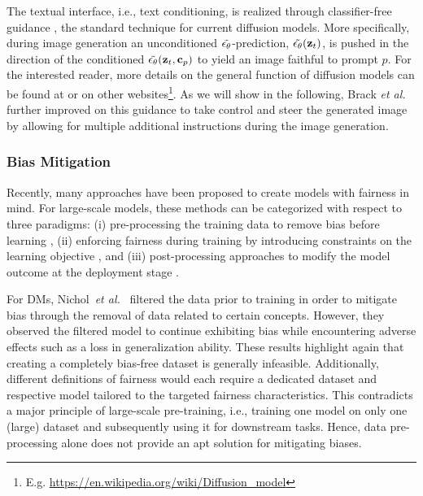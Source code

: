 \documentclass{article}%
\newcommand{\etal}{\emph{et al.}~}
\begin{document}
The textual interface, i.e., text conditioning, is realized through classifier-free guidance \cite{ho2022classifier}, the standard technique for current diffusion models. 
More specifically, during image generation an unconditioned $\Tilde{\epsilon_\theta}$-prediction, $\Tilde{\epsilon_\theta}(\mathbf{z}_t)$, is pushed in the direction of the conditioned $\Tilde{\epsilon_\theta}(\mathbf{z}_t, \mathbf{c}_p)$ to yield an image faithful to prompt $p$. For the interested reader, more details on the general function of diffusion models can be found at \cite{luo2022understanding} or on other websites\footnote{E.g. \url{https://en.wikipedia.org/wiki/Diffusion_model}}.
As we will show in the following, Brack \etal \cite{brack2023Sega} further improved on this guidance to take control and steer the generated image by allowing for multiple additional instructions during the image generation. 


\subsubsection*{Bias Mitigation}
\label{sec:related}
Recently, many approaches have been proposed to create models with fairness in mind. For large-scale models, these methods can be categorized with respect to three paradigms: (i) pre-processing the training data to remove bias before learning \cite{yang20balancing,Prabhu2020LargeID,schramowski2022can,xu18fairgan,Sattigeri19fairngan,nichol2022glide}, (ii) enforcing fairness during training by introducing constraints on the learning objective \cite{edwards15adversary,zhang18adversarialfairness,Li_2022_ECCV,berg-etal-2022-prompt}, and (iii) post-processing approaches to modify the model outcome at the deployment stage \cite{schramowski2022safe,bansal2022diversify}. 

For DMs, Nichol~\etal \cite{nichol2022glide} filtered the data prior to training in order to mitigate bias through the removal of data related to certain concepts. However, they observed the filtered model to continue exhibiting bias while encountering adverse effects such as a loss in generalization ability. 
These results highlight again that creating a completely bias-free dataset is generally infeasible.
Additionally, different definitions of fairness would each require a dedicated dataset and respective model tailored to the targeted fairness characteristics.
%
This contradicts a major principle of large-scale pre-training, i.e., training one model on only one (large) dataset and subsequently using it for downstream tasks.
Hence, data pre-processing alone does not provide an apt solution for mitigating biases.
 
\end{document}
